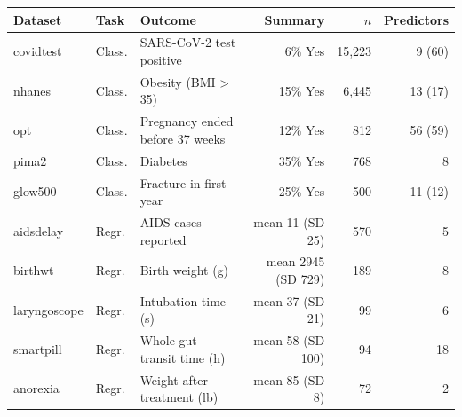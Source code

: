 \begin{tabular}{lllrrr}
\toprule
Dataset & Task & Outcome & Summary & $n$ & Predictors \\
\midrule
covidtest & Class. & SARS-CoV-2 test positive & 6\% Yes & 15,223 & 9 (60) \\
nhanes & Class. & Obesity (BMI > 35) & 15\% Yes & 6,445 & 13 (17) \\
opt & Class. & Pregnancy ended before 37 weeks & 12\% Yes & 812 & 56 (59) \\
pima2 & Class. & Diabetes & 35\% Yes & 768 & 8 \\
glow500 & Class. & Fracture in first year & 25\% Yes & 500 & 11 (12) \\
aidsdelay & Regr. & AIDS cases reported & mean 11 (SD 25) & 570 & 5 \\
birthwt & Regr. & Birth weight (g) & mean 2945 (SD 729) & 189 & 8 \\
laryngoscope & Regr. & Intubation time (s) & mean 37 (SD 21) & 99 & 6 \\
smartpill & Regr. & Whole-gut transit time (h) & mean 58 (SD 100) & 94 & 18 \\
anorexia & Regr. & Weight after treatment (lb) & mean 85 (SD 8) & 72 & 2 \\
\bottomrule
\end{tabular}
